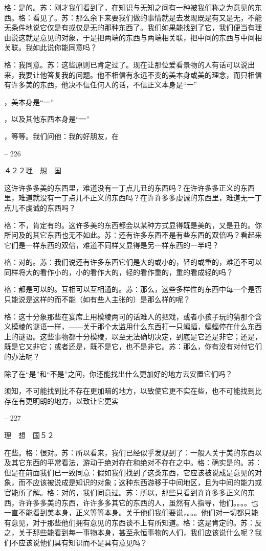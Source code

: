 \documentclass[11pt,oneside]{book}
\begin{document}
\begin{common-format}
    格：是的。苏：刚才我们看到了，在知识与无知之间有一种被我们称之为意见的东西。格：看见了。苏：那么余下来要我们做的事情就是去发现既是有又是无，不能无条件地说它仅是有或仅是无的那种东西了。我们如果能找到了它，我们便当有理由说这就是意见的对象，于是把两端的东西与两端相关联，把中间的东西与中间相关联。我如此说你能同意吗？

    格：我同意。苏：这些原则已肯定过了。现在让那位爱看景物的人有话可以说出来，我要让他答复我的问题。他不相信有永远不变的美本身或美的理念，而只相信有许多美的东西，他决不信任何人的话，不信正义本身是“一”

    ，美本身是“一”

    ，以及其他东西本身是“一”

    ，等等。我们问他：我的好朋友，在

    

-- 226

    ４２２理　想　国

    这许许多多美的东西里，难道没有一丁点儿丑的东西吗？在许许多多正义的东西里，难道就没有一丁点儿不正义的东西吗？在许许多多虔诚的东西里，难道无一丁点儿不虔诚的东西吗？

    格：不，肯定有的。这许多美的东西都会以某种方式显得既是美的，又是丑的。你所问及的其它东西也无不如此。苏：还有许多东西不是有些东西的双倍吗？看起来它们是一样东西的双倍，难道不同样又显得是另一样东西的一半吗？

    格：对的。苏：我们说还有许多东西它们是大的或小的，轻的或重的，难道不可以同样将大的看作小的，小的看作大的，轻的看作重的，重的看成轻的吗？

    格：都是可以的。互相可以互相通的。苏：那么，这些多样性的东西中每一个是否只能说是这样的而不能（如有些人主张的）是那么样的呢？

    格：这十分象那些在宴席上用模棱两可的话难人的把戏，或者小孩子玩的猜那个含义模棱的谜语一样，——关于那个太监用什么东西打一只蝙蝠，蝙蝠停在什么东西上的谜语。这些事物都十分模棱，以至无法确切决定，到底是它还是非它；还是，既是它又非它；或者还是，既不是它，也不是非它。苏：那么，你有没有对付它们的办法呢？

    除了在“是”和“不是”之间，你还能找出什么更加好的地方去安置它们吗？

    须知，不可能找到比不存在更加暗的地方，以致使它更不实在些，也不可能找到比存在有更明朗的地方，以致让它更实

    

-- 227

    理　想　国５２

    在些。格：很对。苏：所以看来，我们已经似乎发现到了：一般人关于美的东西以及其它东西的平常看法，游动于绝对存在和绝对不存在之中。格：确实是的。苏：但是在前面我们已一致同意：假如我们找到了这类东西，它应该被说成是意见的对象，而不应该被说成是知识的对象；这种东西游移于中间地区，且为中间的能力或官能所了解。格：对的，我们同意过。苏：所以，那些只看到许许多多正义的东西，许许多多美的东西，许许多多其它的东西的人，虽然有人指导，他们。。。。也一直不能看到美本身，正义等等本身。关于他们我们要说，。。。他们对一切都只能有意见，对于那些他们拥有意见的东西谈不上有所知道。格：这是肯定的。苏：反之，关于那些能看到每一事物本身，甚至永恒事物的人们，我们应该说什么呢？我们不应该说他们具有知识而不是具有意见吗？


\end{common-format}
\end{document}
